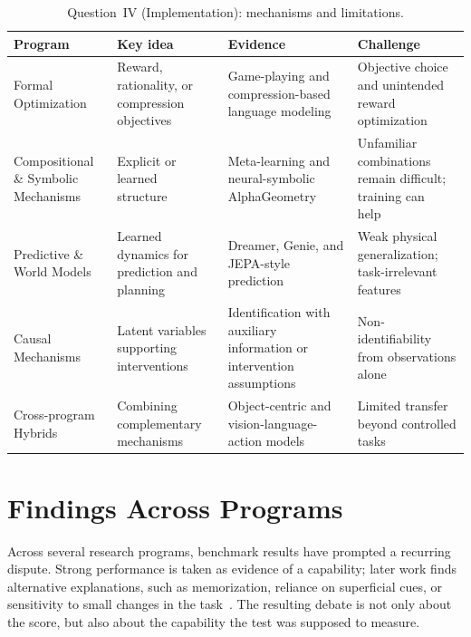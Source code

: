 \documentclass[acmsmall,screen,review,anonymous]{acmart}
\begin{document}
\begin{table}[t]
\caption{Question~IV (Implementation): mechanisms and limitations.}
\label{tab:implementation-framework}
\centering
\footnotesize
\setlength{\tabcolsep}{3pt}
\renewcommand{\arraystretch}{1.13}
\begin{tabularx}{\textwidth}{p{} Y Y Y}
\toprule
Program & Key idea & Evidence & Challenge \\
\midrule
Formal Optimization &
Reward, rationality, or compression objectives~\citep{silver2021, ma2022} &
Game-playing and compression-based language modeling~\citep{Silver2016, deletang2024language} &
Objective choice and unintended reward optimization~\citep{bowling2023settleing, gao2023scaling} \\
\addlinespace
Compositional \& Symbolic Mechanisms &
Explicit or learned structure~\citep{marcus2020, garcez2023nesy, lake2019meta} &
Meta-learning and neural-symbolic AlphaGeometry~\citep{Lake2023-ut, trinh2024solving} &
Unfamiliar combinations remain difficult; training can help~\citep{lake2018compskill, csordas2021devil} \\
\addlinespace
Predictive \& World Models &
Learned dynamics for prediction and planning~\citep{ha2018recurrentworld, lecun2022} &
Dreamer, Genie, and JEPA-style prediction~\citep{hafner2020dreamcontrollearningbehaviors, bruce2024geniegenerativeinteractiveenvironments, bardes2024vjepa} &
Weak physical generalization; task-irrelevant features~\citep{motamed2026physics, kang2025how, sobal2022jointembeddingpredictivearchitectures} \\
\addlinespace
Causal Mechanisms &
Latent variables supporting interventions~\citep{scholkopf2021} &
Identification with auxiliary information or intervention assumptions~\citep{hyvarinen2019auxiliary, pmlr-v202-ahuja23a} &
Non-identifiability from observations alone~\citep{hyvarinen1999nonlinear} \\
\addlinespace
Cross-program Hybrids &
Combining complementary mechanisms~\citep{kipf2020cswm} &
Object-centric and vision-language-action models~\citep{kipf2020cswm, brohan2023rt2visionlanguageactionmodelstransfer} &
Limited transfer beyond controlled tasks~\citep{dittadi2022generalizationrobustnessimplicationsobjectcentric} \\
\bottomrule
\end{tabularx}
\end{table}

\section{Findings Across Programs}
\label{sec:cross}
Across several research programs, benchmark results have prompted a recurring dispute.
%
Strong performance is taken as evidence of a capability; later work finds alternative explanations, such as memorization, reliance on superficial cues, or sensitivity to small changes in the task~\citep{mirzadeh2025gsmsymbolicunderstandinglimitationsmathematical, turpin2023language}.
%
The resulting debate is not only about the score, but also about the capability the test was supposed to measure.
\end{document}
